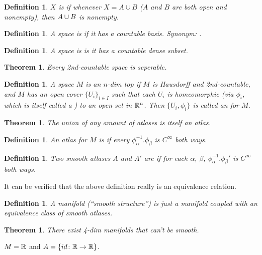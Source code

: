 \documentclass[11pt]{amsbook}
\theoremstyle{mystyle} %
\newtheorem{thrm}[thm]{Theorem}
\newtheorem{defi}[thm]{Definition}
\numberwithin{thm}{section}
\begin{document}
\begin{defi}
	$X$ is  if whenever $X = A \cup B$ ($A$ and $B$ are both open and nonempty), then $A \cup B$ is nonempty.
\end{defi}

\begin{defi}
	A space is  if it has a countable basis.  Synonym: .
\end{defi}
\begin{defi}
	A space is  is it has a countable dense subset.
\end{defi}
\begin{thrm}
	Every 2nd-countable space is seperable.
\end{thrm}
\begin{defi}
	A space $M$ is an $n$-dim top  if $M$ is Hausdorff and 2nd-countable, and $M$ has an open cover $\{U_i\}_{i \in I}$ such that each $U_i$ is homeomorphic (via $\phi_i$, which is itself called a ) to an open set in ${\mathbb R}^n$.  Then $\{ U_i, \phi_i \}$ is called an  for $M$.
\end{defi}
\begin{thrm}
	The union of any amount of atlases is itself an atlas.
\end{thrm}

\begin{defi}
	An atlas for $M$ is  if every $\phi_\alpha^{-1}.\phi_\beta$ is $C^\infty$ both ways.
\end{defi}

\begin{defi}
	Two smooth atlases $A$ and $A'$ are  if for each $\alpha$, $\beta$, $\phi_\alpha^{-1}.\phi_\beta'$ is $C^\infty$ both ways.
\end{defi}
\begin{rmk}
	It can be verified that the above definition really is an equivalence relation.
\end{rmk}

\begin{defi}
	A  manifold (``smooth structure'') is just a manifold coupled with an equivalence class of smooth atlases.
\end{defi}

\begin{thrm}
	There exist 4-dim manifolds that can't be smooth.
\end{thrm}



\begin{example}
	$M = {\mathbb R}$ and $A = \{ id\colon {\mathbb R} \to {\mathbb R} \}$.
\end{example}
\end{document}
